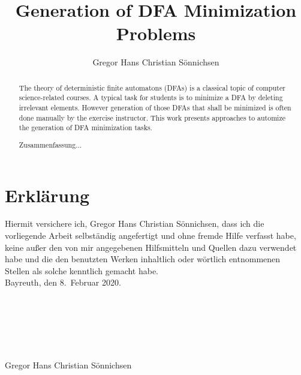\documentclass[a4paper, oneside, 11pt]{report}
\title{Generation of DFA Minimization Problems}
\author{Gregor Hans Christian Sönnichsen}
\theoremstyle{definition}
\theoremstyle{remark}
\begin{document}
	
	\maketitle
	
	\begin{abstract}
        The theory of deterministic finite automatons (DFAs) is a classical topic of computer science-related courses. A typical task for students is to minimize a DFA by deleting irrelevant elements. However generation of those DFAs that shall be minimized is often done manually by the exercise instructor. This work presents approaches to automize the generation of DFA minimization tasks.
	\end{abstract}

	\renewcommand{\abstractname}{Generierung von DFA Minimierungsproblemen\\-\\Zusammenfassung}
	\begin{abstract}
		Zusammenfassung$\ldots$
	\end{abstract}
	
	
	\renewcommand{\contentsname}{Table of Contents}
	\tableofcontents
	
	
	
	
	
	
	
	\appendix
	
	\nocite{*}
	
	
	
	\chapter*{Erklärung}
	
	Hiermit versichere ich, Gregor Hans Christian Sönnichsen, dass ich die vorliegende Arbeit selbständig angefertigt und	ohne fremde Hilfe verfasst habe, keine außer den von mir angegebenen Hilfsmitteln und Quellen dazu verwendet habe und die den benutzten Werken inhaltlich oder wörtlich entnommenen Stellen als solche kenntlich gemacht habe. \\
	
	\noindent Bayreuth, den 8.\ Februar 2020. \\\\\\\\\\\\\\
	\noindent Gregor Hans Christian Sönnichsen
\end{document}

